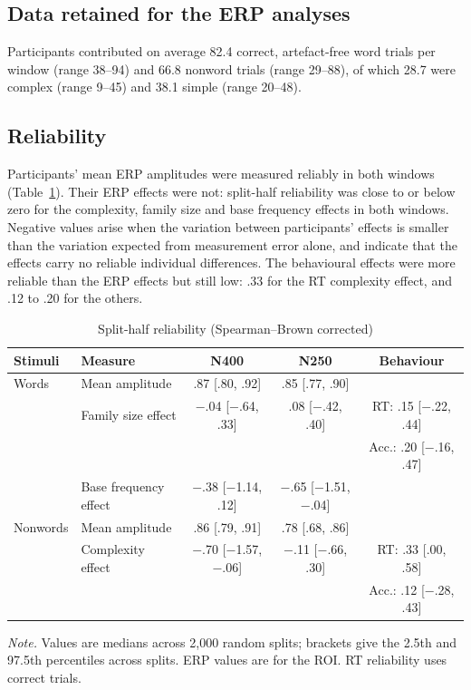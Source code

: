 \subsection{Data retained for the ERP analyses}
Participants contributed on average 82.4 correct, artefact-free word trials per
window (range 38--94) and 66.8 nonword trials (range 29--88), of which 28.7
were complex (range 9--45) and 38.1 simple (range 20--48).

\subsection{Reliability}
Participants' mean ERP amplitudes were measured reliably in both windows
(Table~\ref{tab:reliability}). Their ERP effects were not: split-half
reliability was close to or below zero for the complexity, family size and base
frequency effects in both windows. Negative values arise when the variation
between participants' effects is smaller than the variation expected from
measurement error alone, and indicate that the effects carry no reliable
individual differences. The behavioural effects were more reliable than the ERP
effects but still low: .33 for the RT complexity effect, and .12 to .20 for the
others.

\begin{table}[htbp]
\centering
\caption{Split-half reliability (Spearman--Brown corrected)}
\label{tab:reliability}
\begin{tabular}{llccc}
\toprule
Stimuli & Measure & N400 & N250 & Behaviour \\
\midrule
Words    & Mean amplitude        & .87 [.80, .92]          & .85 [.77, .90]          & \\
         & Family size effect    & $-$.04 [$-$.64, .33]    & .08 [$-$.42, .40]       & RT: .15 [$-$.22, .44] \\
         &                       &                         &                         & Acc.: .20 [$-$.16, .47] \\
         & Base frequency effect & $-$.38 [$-$1.14, .12]   & $-$.65 [$-$1.51, $-$.04] & \\
Nonwords & Mean amplitude        & .86 [.79, .91]          & .78 [.68, .86]          & \\
         & Complexity effect     & $-$.70 [$-$1.57, $-$.06] & $-$.11 [$-$.66, .30]    & RT: .33 [.00, .58] \\
         &                       &                         &                         & Acc.: .12 [$-$.28, .43] \\
\bottomrule
\end{tabular}

\vspace{2pt}
\begin{minipage}{0.9\linewidth}\footnotesize
\textit{Note.} Values are medians across 2,000 random splits; brackets give the
2.5th and 97.5th percentiles across splits. ERP values are for the ROI. RT
reliability uses correct trials.
\end{minipage}
\end{table}


